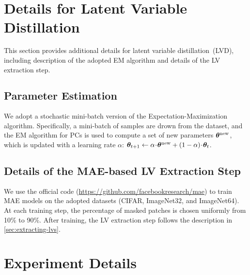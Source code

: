 \documentclass{article} %
\begin{document}

\section{Details for Latent Variable Distillation}

This section provides additional details for latent variable distillation~(LVD), including description of the adopted EM algorithm and details of the LV extraction step.

\subsection{Parameter Estimation}
\label{appx:em}

We adopt a stochastic mini-batch version of the Expectation-Maximization algorithm. Specifically, a mini-batch of samples are drown from the dataset, and the EM algorithm for PCs \citep{choi2021group,dang2021juice} is used to compute a set of new parameters $\boldsymbol{\theta}^{\mathrm{new}}$, which is updated with a learning rate $\alpha$: $\boldsymbol{\theta}_{t+1} \leftarrow \alpha \!\cdot\! \boldsymbol{\theta}^{\mathrm{new}} + (1-\alpha) \!\cdot\! \boldsymbol{\theta}_{t}$.

\subsection{Details of the MAE-based LV Extraction Step}
\label{appx:mae}

We use the official code (\url{https://github.com/facebookresearch/mae}) to train MAE models on the adopted datasets (\ie CIFAR, ImageNet32, and ImageNet64). At each training step, the percentage of masked patches is chosen uniformly from 10\% to 90\%. After training, the LV extraction step follows the description in \cref{sec:extracting-lvs}.

\section{Experiment Details}
\label{sec:exp-details}
\end{document}
